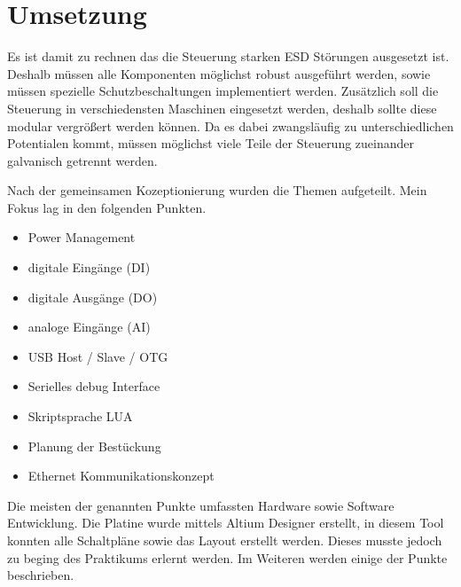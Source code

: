 \documentclass[praktikum,german]{hgbthesis}
\begin{document}
\section{Umsetzung}
Es ist damit zu rechnen das die Steuerung starken ESD Störungen ausgesetzt ist. Deshalb müssen alle Komponenten möglichst robust ausgeführt werden, sowie müssen spezielle Schutzbeschaltungen implementiert werden. Zusätzlich soll die Steuerung in verschiedensten Maschinen eingesetzt werden, deshalb sollte diese modular vergrößert werden können. Da es dabei zwangsläufig zu unterschiedlichen Potentialen kommt, müssen möglichst viele Teile der Steuerung zueinander galvanisch getrennt werden.

Nach der gemeinsamen Kozeptionierung wurden die Themen aufgeteilt. Mein Fokus lag in den folgenden Punkten.

\begin{itemize}
\item Power Management
\item digitale Eingänge (DI)
\item digitale Ausgänge (DO)
\item analoge Eingänge (AI)
\item USB Host / Slave / OTG
\item Serielles debug Interface
\item Skriptsprache LUA
\item Planung der Bestückung
\item Ethernet Kommunikationskonzept
\end{itemize}

Die meisten der genannten Punkte umfassten Hardware sowie Software Entwicklung. Die Platine wurde mittels Altium Designer erstellt, in diesem Tool konnten alle Schaltpläne sowie das Layout erstellt werden. Dieses musste jedoch zu beging des Praktikums erlernt werden. Im Weiteren werden einige der Punkte beschrieben. 
\end{document}
